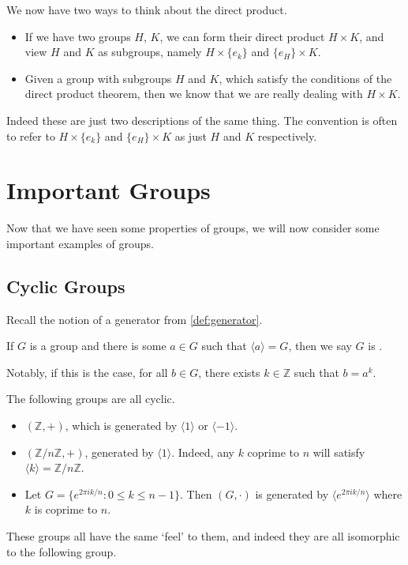 \documentclass[a4paper]{scrartcl}
\begin{document}
We now have two ways to think about the direct product. 
\begin{itemize}
	\item If we have two groups $H$, $K$, we can form their direct product $H \times K$, and view $H$ and $K$ as subgroups, namely $H \times \{e_k\}$ and $\{e_H\} \times K$.
	\item Given a group with subgroups $H$ and $K$, which satisfy the conditions of the direct product theorem, then we know that we are really dealing with $H \times K$.
\end{itemize}
Indeed these are just two descriptions of the same thing. The convention is often to refer to $H \times \{e_k\}$ and $\{e_H\} \times K$ as just $H$ and $K$ respectively.

\section{Important Groups}

Now that we have seen some properties of groups, we will now consider some important examples of groups.

\subsection{Cyclic Groups}

Recall the notion of a generator from \autoref{def:generator}.

\begin{definition}[Cyclic]
	If $G$ is a group and there is some $a \in G$ such that $\langle a \rangle = G$, then we say $G$ is . 
\end{definition}
Notably, if this is the case, for all $b \in G$, there exists $k \in \mathbb{Z}$ such that $b = a^k$.

\begin{example}
	The following groups are all cyclic.
	\begin{itemize}
		\item $(\mathbb{Z}, +)$, which is generated by $\langle 1 \rangle$ or $\langle -1 \rangle$.
		\item $(\mathbb{Z}/n\mathbb{Z}, +)$, generated by $\langle 1 \rangle$. Indeed, any $k$ coprime to $n$ will satisfy $\langle k \rangle = \mathbb{Z}/n\mathbb{Z}$.
		\item Let $G = \{ e^{2 \pi i k/n}  : 0 \leq k \leq n - 1 \}$. Then $(G, \cdot)$ is generated by $\langle e^{2 \pi i k/n}\rangle$ where $k$ is coprime to $n$.
	\end{itemize}
\end{example}
These groups all have the same `feel' to them, and indeed they are all isomorphic to the following group.
\end{document}
